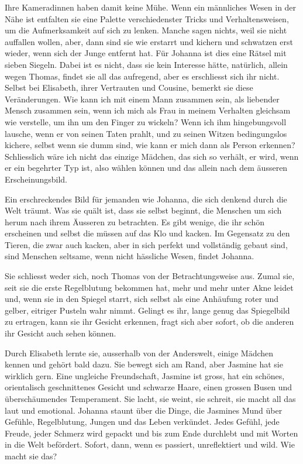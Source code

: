 \documentclass[10pt,titlepage,a5paper]{book}
\begin{document}
Ihre Kameradinnen haben damit keine Mühe. Wenn ein männliches Wesen in der Nähe ist entfalten sie eine Palette verschiedenster Tricks und Verhaltensweisen, um die Aufmerksamkeit auf sich zu lenken. Manche sagen nichts, weil sie nicht auffallen wollen, aber, dann sind sie wie erstarrt und kichern und schwatzen erst wieder, wenn sich der Junge entfernt hat.
Für Johanna ist dies eine Rätsel mit sieben Siegeln. Dabei ist es nicht, dass sie kein Interesse hätte, natürlich, allein wegen Thomas, findet sie all das aufregend, aber es erschliesst sich ihr nicht. Selbst bei Elisabeth, ihrer Vertrauten und Cousine, bemerkt sie diese Veränderungen. Wie kann ich mit einem Mann zusammen sein, als liebender Mensch zusammen sein, wenn ich mich als Frau in meinem Verhalten gleichsam wie verstelle, um ihn um den Finger zu wickeln? Wenn ich ihm hingebungsvoll lausche, wenn er von seinen Taten prahlt, und zu seinen Witzen bedingungslos kichere, selbst wenn sie dumm sind, wie kann er  mich dann als Person erkennen? Schliesslich wäre ich nicht das einzige Mädchen, das sich so verhält, er wird, wenn er ein begehrter Typ ist, also wählen können und das allein nach dem äusseren Erscheinungsbild. 

Ein erschreckendes Bild für jemanden wie Johanna, die sich denkend durch die Welt träumt. Was sie quält ist, dass sie selbst beginnt, die Menschen um sich herum nach ihrem Äusseren zu betrachten. Es gibt wenige, die ihr schön erscheinen und selbst die müssen auf das Klo und kacken. Im Gegensatz zu den Tieren, die zwar auch kacken, aber in sich perfekt und vollständig gebaut sind, sind Menschen seltsame, wenn nicht hässliche Wesen, findet Johanna.  

Sie schliesst weder sich, noch Thomas von der Betrachtungsweise aus. Zumal sie, seit sie die erste Regelblutung bekommen hat,  mehr und mehr unter Akne leidet und, wenn sie in den Spiegel starrt, sich selbst als eine Anhäufung roter und gelber, eitriger Pusteln wahr nimmt. Gelingt es ihr, lange genug das Spiegelbild zu ertragen, kann sie ihr Gesicht erkennen, fragt sich aber sofort, ob die anderen ihr Gesicht auch sehen können.

Durch Elisabeth lernte sie, ausserhalb von der Anderswelt, einige Mädchen kennen und gehört bald dazu. Sie bewegt sich am Rand, aber Jasmine hat sie wirklich gern. Eine ungleiche Freundschaft, Jasmine ist gross, hat ein schönes, orientalisch geschnittenes Gesicht und schwarze Haare, einen grossen Busen und überschäumendes Temperament. Sie lacht, sie weint, sie schreit, sie macht all das laut und emotional. Johanna staunt über die Dinge, die Jasmines Mund über Gefühle, Regelblutung, Jungen und das Leben verkündet. Jedes Gefühl, jede Freude, jeder Schmerz wird gepackt und bis zum Ende durchlebt und mit Worten in die Welt befördert. Sofort, dann, wenn es passiert, unreflektiert und wild. Wie macht sie das?
\end{document}
